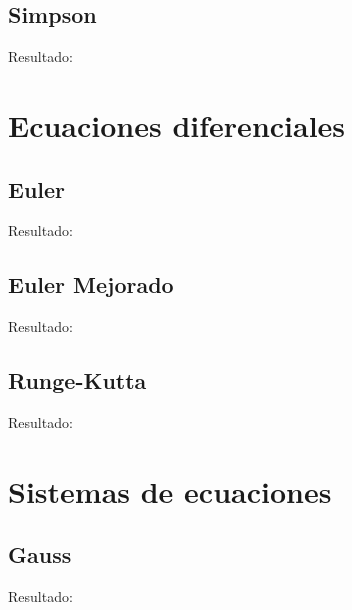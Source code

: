 \documentclass[a4paper,10pt]{article}
\begin{document}
		\subsection{Simpson}
 			
 			Resultado:
 			

	\section{Ecuaciones diferenciales}

		\subsection{Euler}
 			
 			Resultado:
 			

		\subsection{Euler Mejorado}
 			
 			Resultado:
 			

		\subsection{Runge-Kutta}
 			
 			Resultado:
 			

	\section{Sistemas de ecuaciones}

		\subsection{Gauss}
 			
 			Resultado:
 			
\end{document}
